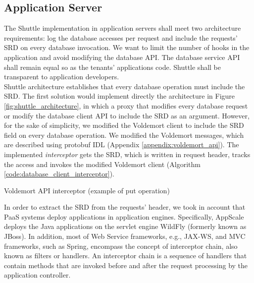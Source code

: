 \subsection{Application Server}\label{sec:impl:normal:compute}
The Shuttle implementation in application servers shall meet two architecture requirements: log the database accesses per request and include the requests' \ac{SRD} on every database invocation. We want to limit the number of hooks in the application and avoid modifying the database \ac{API}. The database service \ac{API} shall remain equal so as the tenants' applications code. Shuttle shall be transparent to application developers.\\


Shuttle architecture establishes that every database operation must include the \ac{SRD}. The first solution would implement directly the architecture in Figure \ref{fig:shuttle_architecture}, in which a proxy that modifies every database request or modify the database client \ac{API} to include the \ac{SRD} as an argument. However, for the sake of simplicity, we modified the Voldemort client to include the \ac{SRD} field on every database operation. We modified the Voldemort messages, which are described using \ac{protobuf} \acs{IDL} (Appendix \ref{appendix:voldemort_api}). The implemented \emph{interceptor} gets the \ac{SRD}, which is written in request header, tracks the access and invokes the modified Voldemort client (Algorithm \ref{code:database_client_interceptor}).

\begin{algorithm}
\DontPrintSemicolon{}
 
\caption{Voldemort \ac{API} interceptor (example of put operation)}\label{code:database_client_interceptor}
\end{algorithm}

In order to extract the \ac{SRD} from the requests' header, we took in account that \ac{PaaS} systems deploy applications in application engines. Specifically, AppScale deploys the Java applications on the servlet engine WildFly \cite{wildfly} (formerly known as JBoss). In addition, most of Web Service frameworks, e.g., \ac{JAX-WS}, and \ac{MVC} frameworks, such as Spring, encompass the concept of interceptor chain, also known as filters or handlers. An interceptor chain is a sequence of handlers that contain methods that are invoked before and after the request processing by the application controller.

